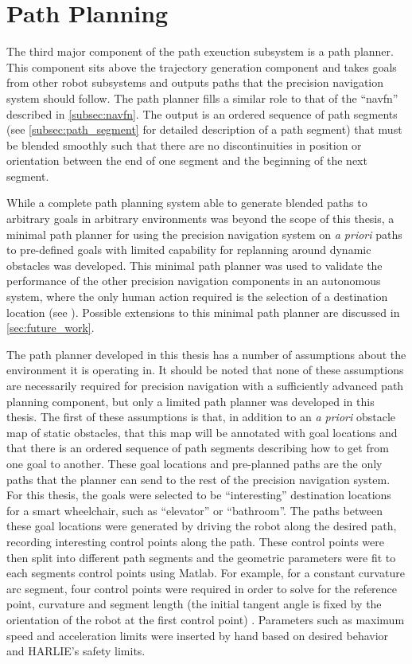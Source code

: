 \section{Path Planning}\label{sec:path_planning}

The third major component of the path exeuction subsystem is a path planner. This component sits above the trajectory generation component and takes goals from other robot subsystems and outputs paths that the precision navigation system should follow. The path planner fills a similar role to that of the ``navfn'' described in \autoref{subsec:navfn}. The output is an ordered sequence of path segments (see \autoref{subsec:path_segment} for detailed description of a path segment) that must be blended smoothly such that there are no discontinuities in position or orientation between the end of one segment and the beginning of the next segment.

While a complete path planning system able to generate blended paths to arbitrary goals in arbitrary environments was beyond the scope of this thesis, a minimal path planner for using the precision navigation system on \emph{a priori} paths to pre-defined goals with limited capability for replanning around dynamic obstacles was developed. This minimal path planner was used to validate the performance of the other precision navigation components in an autonomous system, where the only human action required is the selection of a destination location (see ). Possible extensions to this minimal path planner are discussed in \autoref{sec:future_work}.

The path planner developed in this thesis has a number of assumptions about the environment it is operating in. It should be noted that none of these assumptions are necessarily required for precision navigation with a sufficiently advanced path planning component, but only a limited path planner was developed in this thesis. The first of these assumptions is that, in addition to an \emph{a priori} obstacle map of static obstacles, that this map will be annotated with goal locations and that there is an ordered sequence of path segments describing how to get from one goal to another. These goal locations and pre-planned paths are the only paths that the planner can send to the rest of the precision navigation system. For this thesis, the goals were selected to be ``interesting'' destination locations for a smart wheelchair, such as ``elevator'' or ``bathroom''. The paths between these goal locations were generated by driving the robot along the desired path, recording interesting control points along the path. These control points were then split into different path segments and the geometric parameters were fit to each segments control points using Matlab. For example, for a constant curvature arc segment, four control points were required in order to solve for the reference point, curvature and segment length (the initial tangent angle is fixed by the orientation of the robot at the first control point) . Parameters such as maximum speed and acceleration limits were inserted by hand based on desired behavior and HARLIE's safety limits.

